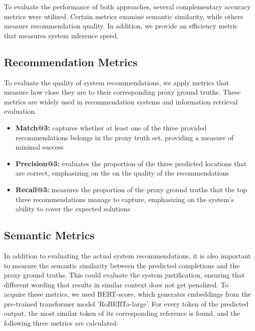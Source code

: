 To evaluate the performance of both approaches, several complementary accuracy metrics were utilized. Certain metrics examine semantic similarity, while others measure recommendation quality. In addition, we provide an efficiency metric that measures system inference speed.



\subsection{Recommendation Metrics}

To evaluate the quality of system recommendations, we apply metrics that measure how close they are to their corresponding proxy ground truths. These metrics are widely used in recommendation systems and information retrieval evaluation.


\begin{itemize}
    \item \textbf{Match@3:} captures whether at least one of the three provided recommendations belongs in the proxy truth set, providing a measure of minimal success

    \item \textbf{Precision@3:} evaluates the proportion of the three predicted locations that are correct, emphasizing on the on the quality of the recommendations

    \item \textbf{Recall@3:} measures the proportion of the proxy ground truths that the top three recommendations manage to capture, emphasizing on the system’s ability to cover the expected solutions
\end{itemize}



\subsection{Semantic Metrics}

In addition to evaluating the actual system recommendations, it is also important to measure the semantic similarity between the predicted completions and the proxy ground truths. This could evaluate the system justification, ensuring that different wording that results in similar context does not get penalized. To acquire these metrics, we used BERT-score, which generates embeddings from the pre-trained transformer model 'RoBERTa-large'. For every token of the predicted output, the most similar token of its corresponding reference is found, and the following three metrics are calculated:


